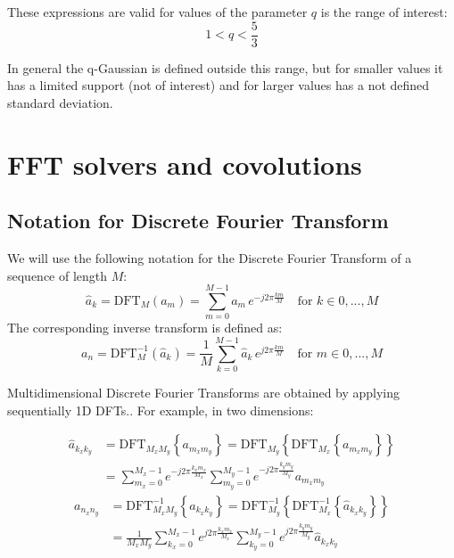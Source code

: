 These expressions are valid for values of the parameter $q$ is   the range of interest:
\begin{equation}
1<q<\frac{5}{3}
\end{equation}

In general the q-Gaussian is defined outside this range, but for smaller values it has a limited support (not of interest) and for larger values has a not defined standard deviation.

\section{FFT solvers and covolutions}

\subsection{Notation for Discrete Fourier Transform}
We will use the following notation for the Discrete Fourier Transform of a sequence of length $M$:
\begin{equation}
\hat{a}_k = \text{DFT}_M(a_m) =  \sum_{m=0}^{M-1} a_m\, e^{-j2\pi  \frac{km}{M}}  \quad \text{for } k \in 0, ..., M
\end{equation}
The corresponding inverse transform is defined as:
\begin{equation}
{a}_n = \text{DFT}^{-1}_M(\hat{a}_k) =  \frac{1}{M}\sum_{k=0}^{M-1} \hat{a}_k\, e^{j2\pi  \frac{km}{M}}  \quad \text{for } m \in 0, ..., M
\end{equation}

Multidimensional Discrete Fourier Transforms are obtained by applying sequentially 1D DFTs.. For example, in two dimensions:

\begin{equation}
\begin{split}
\hat{a}_{k_xk_y} &= \text{DFT}_{M_xM_y}\left\{a_{m_xm_y}\right\}  
= \text{DFT}_{M_y} \left\{\text{DFT}_{M_x}\left\{a_{m_xm_y}\right\}\right\}\\  
&=\sum_{m_x=0}^{M_x-1} e^{-j 2\pi  \frac{k_x m_x}{M_x}} 
\sum_{m_y=0}^{M_y-1} e^{-j 2\pi  \frac{k_y m_y}{M_y}} a_{m_xm_y}
\end{split}
\end{equation}
\begin{equation}
\begin{split}
{a}_{n_xn_y} &= \text{DFT}^{-1}_{M_xM_y}\left\{a_{k_x k_y}\right\}  
= \text{DFT}^{-1}_{M_y} \left\{\text{DFT}^{-1}_{M_x}\left\{\hat{a}_{k_x k_y}\right\}\right\}\\  
&=\frac{1}{M_x M_y}\sum_{k_x=0}^{M_x-1} e^{j 2\pi  \frac{k_x m_x}{M_x}} 
\sum_{k_y=0}^{M_y-1} e^{j 2\pi  \frac{k_y m_y}{M_y}} \hat{a}_{k_xk_y}
\end{split}
\end{equation}



